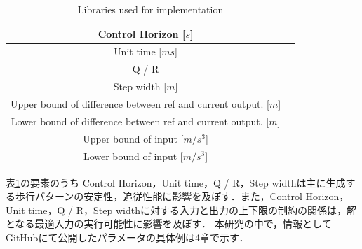 \begin{table}[htbp]
  \centering
  \begin{tabular}{|c|c|} \hline
    Control Horizon  [$s$]                                           \\ \hline
    Unit time  [$ms$]                                                \\ \hline
    Q / R                                                            \\ \hline
    Step width  [$m$]                                                \\ \hline
    Upper bound of difference between ref and current output.  [$m$] \\ \hline
    Lower bound of difference between ref and current output.  [$m$] \\ \hline
    Upper bound of input  [$m/s^{3}$]                                \\ \hline
    Lower bound of input  [$m/s^{3}$]                                \\ \hline
  \end{tabular}
  \caption{Libraries used for implementation}
  \label{tb:parametor_list}
\end{table}

表\ref{tb:parametor_list}の要素のうち Control Horizon，Unit time，Q / R，Step widthは主に生成する歩行パターンの安定性，追従性能に影響を及ぼす．また，Control Horizon，Unit time，Q / R，Step widthに対する入力と出力の上下限の制約の関係は，解となる最適入力の実行可能性に影響を及ぼす．
本研究の中で，情報としてGitHub\cite{MYGITHUB}にて公開したパラメータの具体例は4章で示す．